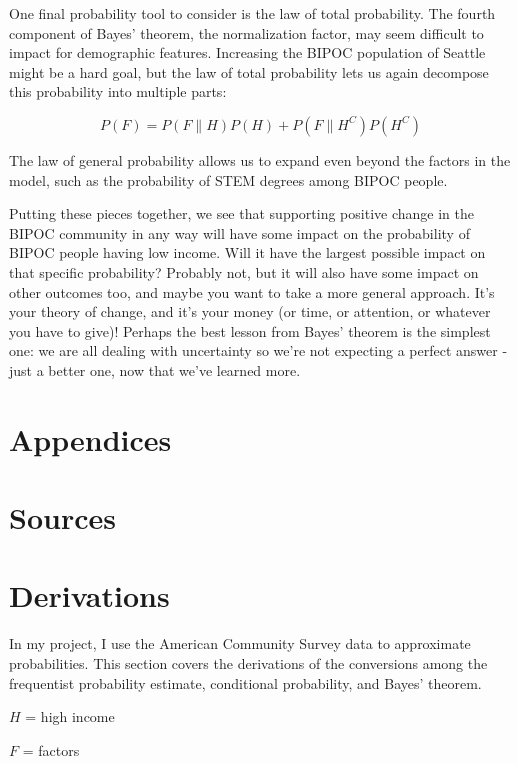 \documentclass[11pt]{article}
\begin{document}
One final probability tool to consider is the law of total probability. The fourth component of Bayes' theorem, the normalization factor, may seem difficult to impact for demographic features. Increasing the BIPOC population of Seattle might be a hard goal, but the law of total probability lets us again decompose this probability into multiple parts:

$$P(F) = P(F \| H) P(H) + P(F \| H^C) P(H^C)$$

The law of general probability allows us to expand even beyond the factors in the model, such as the probability of STEM degrees among BIPOC people. 

Putting these pieces together, we see that  supporting positive change in the BIPOC community in any way will have some impact on the probability of BIPOC people having low income. Will it have the largest possible impact on that specific probability? Probably not, but it will also have some impact on other outcomes too, and maybe you want to take a more general approach. It's your theory of change, and it's your money (or time, or attention, or whatever you have to give)! Perhaps the best lesson from Bayes' theorem is the simplest one: we are all dealing with uncertainty so we're not expecting a perfect answer - just a better one, now that we've learned more.

\newpage 

\appendix
{}
\section*{Appendices}
\section{Sources}


\printbibliography[heading=none]


\section{Derivations}

In my project, I use the American Community Survey data to approximate probabilities. This section covers the derivations of the conversions among the frequentist probability estimate, conditional probability, and Bayes' theorem.

$H$ = high income

$F$ = factors
\end{document}
